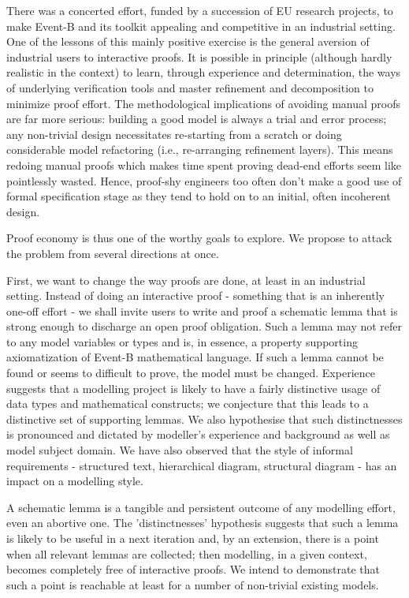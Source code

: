 \documentclass{llncs}
\begin{document}
There was a concerted effort, funded by a succession of EU research projects, to make Event-B and its toolkit appealing and competitive in an industrial setting. One of the lessons of this mainly positive exercise is the general aversion of industrial users to interactive proofs. It is possible in principle (although hardly realistic in the context) to learn, through experience and determination, the ways of underlying verification tools and master refinement and decomposition to minimize proof effort. The methodological implications of avoiding manual proofs are far more serious: building a good model is always a trial and error process; any non-trivial design necessitates re-starting from a scratch or doing considerable model refactoring (i.e., re-arranging refinement layers). This means redoing manual proofs which makes time spent proving dead-end efforts seem like pointlessly wasted. Hence, proof-shy engineers too often don't make a good use of formal specification stage as they tend to hold on to an initial, often incoherent design. 

Proof economy is thus one of the worthy goals to explore. We propose to attack the problem from several directions at once. 

First, we want to change the way proofs are done, at least in an industrial setting. Instead of doing an interactive proof - something that is an inherently one-off effort - we shall invite users to write and proof a schematic lemma that is strong enough to discharge an open proof obligation. Such a lemma may not refer to any model variables or types and is, in essence, a property supporting axiomatization of Event-B mathematical language. If such a lemma cannot be found or seems to difficult to prove, the model must be changed. Experience suggests that a modelling project is likely to have a fairly distinctive usage of data types and mathematical constructs; we conjecture that this leads to a distinctive set of supporting lemmas. We also hypothesise that such distinctnesses is pronounced and dictated by modeller's experience and background as well as model subject domain. We have also observed that the style of informal requirements - structured text, hierarchical diagram, structural diagram - has an impact on a modelling style.

A schematic lemma is a tangible and persistent outcome of any modelling effort, even an abortive one. The 'distinctnesses' hypothesis suggests that such a lemma is likely to be useful in a next iteration and, by an extension, there is a point when all relevant lemmas are collected; then modelling, in a given context, becomes completely free of interactive proofs. We intend to demonstrate that such a point is reachable at least for a number of non-trivial existing models. 
\end{document}
